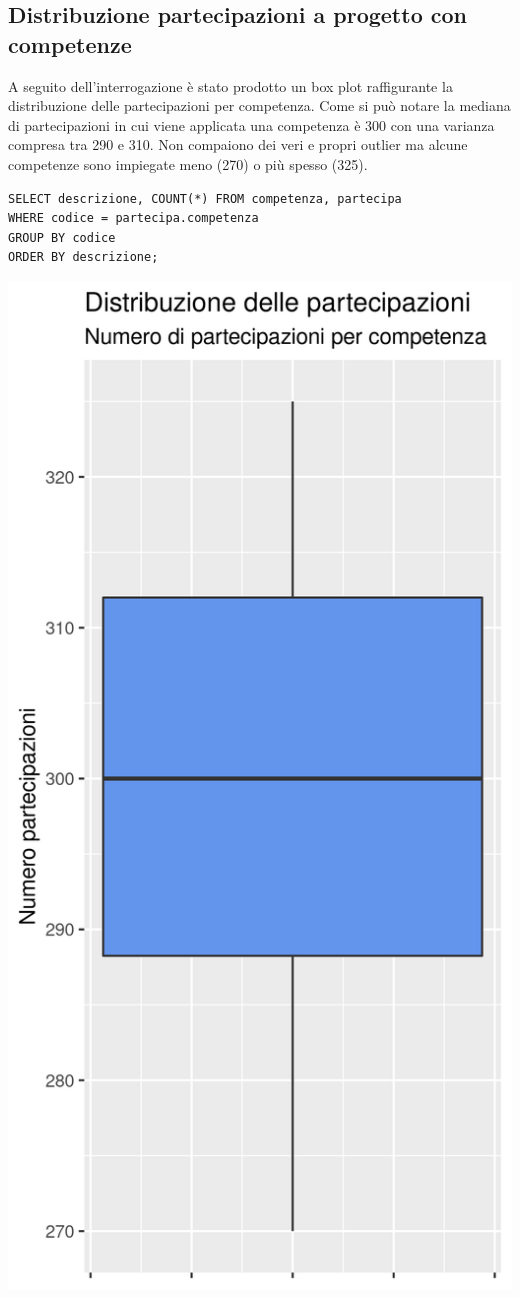 \documentclass{article}
\begin{document}
\subsection{Distribuzione partecipazioni a progetto con competenze}
A seguito dell'interrogazione è stato prodotto un box plot raffigurante la distribuzione delle partecipazioni per competenza.
\newline
Come si può notare la mediana di partecipazioni in cui viene applicata una competenza è 300 con una varianza compresa tra 290 e 310.
\newline
Non compaiono dei veri e propri outlier ma alcune competenze sono impiegate meno (270) o più spesso (325).
\begin{verbatim}
SELECT descrizione, COUNT(*) FROM competenza, partecipa 
WHERE codice = partecipa.competenza 
GROUP BY codice 
ORDER BY descrizione;
\end{verbatim}
\begin{center}
\includegraphics[width=.5\textwidth]{plot_dist_partecipazioni_comptenza.png}
\end{center}

\newpage
\end{document}
